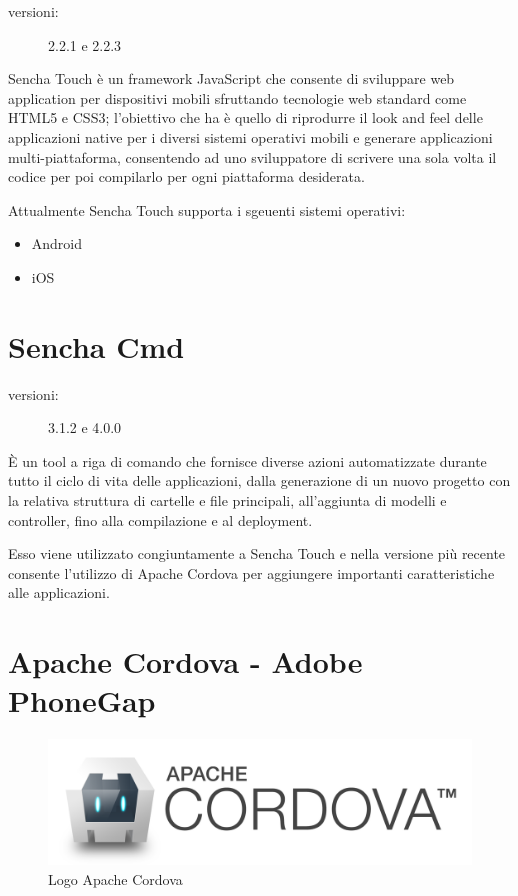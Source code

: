 \begin{description}
\item[versioni:] 2.2.1 e 2.2.3
\end{description}

Sencha Touch è un framework JavaScript che consente di sviluppare web application per dispositivi mobili sfruttando tecnologie web standard come \acs{HTML5} e \acs{CSS3}; l'obiettivo che ha è quello di riprodurre il look and feel delle applicazioni native per i diversi sistemi operativi mobili e generare applicazioni multi-piattaforma, consentendo ad uno sviluppatore di scrivere una sola volta il codice per poi compilarlo per ogni piattaforma desiderata.

Attualmente Sencha Touch supporta i sgeuenti sistemi operativi:
\begin{itemize}
\item Android
\item iOS
\end{itemize}

\section{Sencha Cmd}
\begin{description}
\item[versioni:] 3.1.2 e 4.0.0
\end{description}

È un tool a riga di comando che fornisce diverse azioni automatizzate durante tutto il ciclo di vita delle applicazioni, dalla generazione di un nuovo progetto con la relativa struttura di cartelle e file principali, all'aggiunta di modelli e controller, fino alla compilazione e al deployment.

Esso viene utilizzato congiuntamente a Sencha Touch e nella versione più recente consente l'utilizzo di Apache Cordova per aggiungere importanti caratteristiche alle applicazioni.
 
\section{Apache Cordova - Adobe PhoneGap}
\begin{figure}[htb]
\centering
\includegraphics[scale=0.15]{gfx/cordova_logo_normal_dark}
\caption{Logo Apache Cordova}
\label{fig: logo cordova}
\end{figure}

